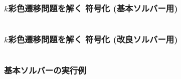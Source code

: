 \begin{frame}[shrink]
  \frametitle{$k$彩色遷移問題を解く 符号化 {\small(基本ソルバー用)}}

\begin{columns}[t]
\begin{column}{0.95\linewidth}
\begin{exampleblock}{}
 
\end{exampleblock}    
\end{column}
\end{columns}


\end{frame}
\begin{frame}[shrink]
  \frametitle{$k$彩色遷移問題を解く 符号化 {\small(改良ソルバー用)}}

\begin{columns}[t]
\begin{column}{0.9\linewidth}
\begin{exampleblock}{}
 
\end{exampleblock}    
\end{column}
\end{columns}
\end{frame}
\begin{frame}[shrink]
  \frametitle{基本ソルバーの実行例}

\begin{exampleblock}{}
 
\end{exampleblock}    
  
\end{frame}
